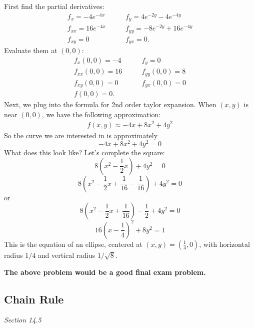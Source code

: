 \documentclass[10pt]{article}
\theoremstyle{definition}
\newcommand{\vt}{\vskip 5mm} %
\newcommand{\Fl}{\vt\noindent\textbf} %
\newcommand{\1}[1]{\textbf{1}_{\left[#1\right]}} %
\begin{document}
First find the partial derivatives:
\begin{align*}
  f_{x} = -4e^{-4x} & \quad \quad f_{y} = 4e^{-2y}-4e^{-4y}\\
  f_{xx} = 16e^{-4x}& \quad  \quad f_{yy} = -8e^{-2y}+16e^{-4y}\\
  f_{xy} = 0 & \quad  \quad f_{yx} = 0.
\end{align*}
Evaluate them at $(0,0)$:
\begin{align*}
  f_{x}(0,0) = -4 & \quad \quad f_{y} = 0\\
  f_{xx}(0,0) = 16& \quad  \quad f_{yy}(0,0) = 8\\
  f_{xy}(0,0) = 0& \quad  \quad f_{yx}(0,0) = 0\\
  f(0,0) = 0.
\end{align*}
Next, we plug into the formula for 2nd order taylor expansion. When $(x,y)$ is
near $(0,0)$, we have the following approximation:
\begin{align*}
  f(x,y) \approx -4x+8x^{2}+4y^{2}
\end{align*}
So the curve we are interested in is approximately
\begin{equation*}
  -4x+8x^{2}+4y^{2} = 0
\end{equation*}
What does this look like? Let's complete the square:
\begin{equation*}
  8(x^{2}-\frac{1}{2}x) + 4y^{2}=0
\end{equation*}
\begin{equation*}
  8(x^{2}-\frac{1}{2}x + \frac{1}{16}-\frac{1}{16} )+4y^{2}=0
\end{equation*}
or
\begin{equation*}
  8(x^{2}-\frac{1}{2}x + \frac{1}{16})-\frac{1}{2}+4y^{2}=0
\end{equation*}
\begin{equation*}
  16 \left( x-\frac{1}{4} \right)^{2} + 8y^{2} = 1
\end{equation*}
This is the equation of an ellipse, centered at $(x,y) = (\frac{1}{4},0)$,
with horizontal radius $1/4$ and vertical radius $1/ \sqrt{8}$.

\Fl{The above problem would be a good final exam problem.}

\subsection{Chain Rule}
\textit{Section 14.5 }
\end{document}
